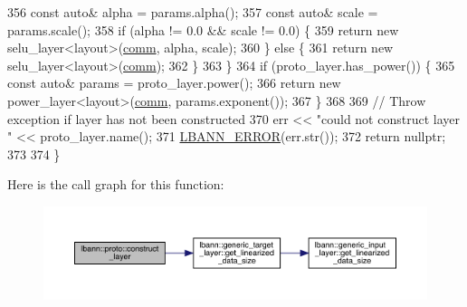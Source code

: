 \begin{DoxyCode}
356     \textcolor{keyword}{const} \textcolor{keyword}{auto}& alpha = params.alpha();
357     \textcolor{keyword}{const} \textcolor{keyword}{auto}& scale = params.scale();
358     \textcolor{keywordflow}{if} (alpha != 0.0 && scale != 0.0) \{
359       \textcolor{keywordflow}{return} \textcolor{keyword}{new} selu\_layer<layout>(\hyperlink{file__io_8cpp_ab048c6f9fcbcfaa57ce68b00263dbebe}{comm}, alpha, scale);
360     \} \textcolor{keywordflow}{else} \{
361       \textcolor{keywordflow}{return} \textcolor{keyword}{new} selu\_layer<layout>(\hyperlink{file__io_8cpp_ab048c6f9fcbcfaa57ce68b00263dbebe}{comm});
362     \}
363   \}
364   \textcolor{keywordflow}{if} (proto\_layer.has\_power()) \{
365     \textcolor{keyword}{const} \textcolor{keyword}{auto}& params = proto\_layer.power();
366     \textcolor{keywordflow}{return} \textcolor{keyword}{new} power\_layer<layout>(\hyperlink{file__io_8cpp_ab048c6f9fcbcfaa57ce68b00263dbebe}{comm}, params.exponent());
367   \}
368 
369   \textcolor{comment}{// Throw exception if layer has not been constructed}
370   err << \textcolor{stringliteral}{"could not construct layer "} << proto\_layer.name();
371   \hyperlink{base_8hpp_a80b1d707117e968a6951b7222e4b2b87}{LBANN\_ERROR}(err.str());
372   \textcolor{keywordflow}{return} \textcolor{keyword}{nullptr};
373 
374 \}
\end{DoxyCode}
Here is the call graph for this function\+:\nopagebreak
\begin{figure}[H]
\begin{center}
\leavevmode
\includegraphics[width=350pt]{namespacelbann_1_1proto_a7e4b0a66836712b1713ae4a121453cde_cgraph}
\end{center}
\end{figure}
\mbox{\label{namespacelbann_1_1proto_a258c17f551e470e3bcab9f5fa7cf0950}} 
